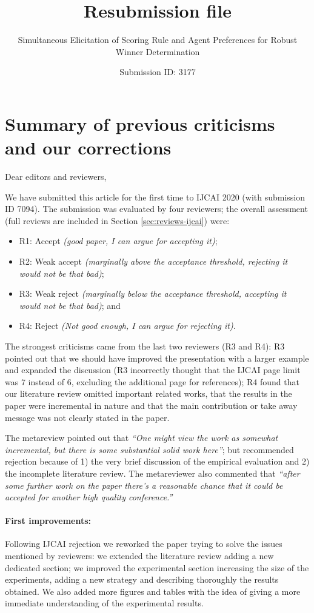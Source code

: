 \documentclass[version=3.21, pagesize, twoside=off, bibliography=totoc, DIV=calc, fontsize=12pt, a4paper]{scrartcl}
\title{Resubmission file}
\subtitle{Simultaneous Elicitation of Scoring Rule and Agent Preferences for Robust Winner Determination}
\author{Submission ID: 3177}
\date{}
\begin{document}
\maketitle

\tableofcontents

\section{Summary of previous criticisms and our corrections}
Dear editors and reviewers,

\medskip
We have submitted this article for the first time to IJCAI 2020 (with submission ID 7094). The submission was evaluated by four reviewers; the overall assessment (full reviews are included in Section \ref{sec:reviews-ijcai}) were: 
\begin{itemize}
\item R1: Accept {\em (good paper, I can argue for accepting it)};
\item R2: Weak accept {\em (marginally above the acceptance threshold, rejecting it would not be that bad)};
\item R3: Weak reject {\em (marginally below the acceptance threshold, accepting it would not be that bad)}; and
\item R4:  Reject {\em (Not good enough, I can argue for rejecting it)}.
\end{itemize}

The strongest criticisms came from the last two reviewers (R3 and R4): R3 pointed out that we should have improved the presentation with a larger example and expanded the discussion (R3 incorrectly thought that the IJCAI page limit was 7 instead of 6, excluding the additional page for references);  R4 found that our literature review omitted important related works, that the results in the paper were incremental in nature and that the main contribution or take away message was not clearly stated in the paper. 

The metareview pointed out that {\em “One might view the work as somewhat incremental, but there is some substantial solid work here”}; but recommended rejection because of 1) the very brief discussion of the empirical evaluation and 2) the incomplete literature review. The metareviewer also commented that {\em “after some further work on the paper there's a reasonable chance that it could be accepted for another high quality conference.”}

\medskip
\paragraph*{First improvements:}Following IJCAI rejection we reworked the paper trying to solve the issues mentioned by reviewers: we extended the literature review adding a new dedicated section; we improved the experimental section increasing the size of the experiments, adding a new strategy and describing thoroughly the results obtained. We also added more figures and tables with the idea of giving a more immediate understanding of the experimental results. %
\end{document}
